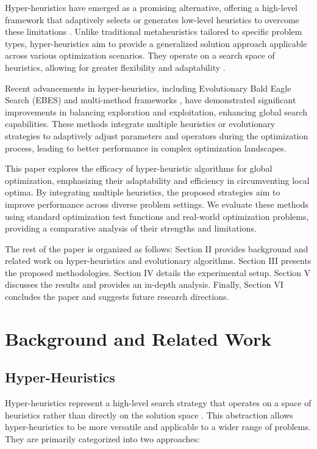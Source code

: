 \documentclass[conference]
{IEEEtran}
\begin{document}
Hyper-heuristics have emerged as a promising alternative, offering a high-level framework that adaptively selects or generates low-level heuristics to overcome these limitations \cite{burke2013hyper}. Unlike traditional metaheuristics tailored to specific problem types, hyper-heuristics aim to provide a generalized solution approach applicable across various optimization scenarios. They operate on a search space of heuristics, allowing for greater flexibility and adaptability \cite{chakhlevitch2008hyper}.

Recent advancements in hyper-heuristics, including Evolutionary Bald Eagle Search (EBES) and multi-method frameworks \cite{grobler2010alternative}, have demonstrated significant improvements in balancing exploration and exploitation, enhancing global search capabilities. These methods integrate multiple heuristics or evolutionary strategies to adaptively adjust parameters and operators during the optimization process, leading to better performance in complex optimization landscapes.

This paper explores the efficacy of hyper-heuristic algorithms for global optimization, emphasizing their adaptability and efficiency in circumventing local optima. By integrating multiple heuristics, the proposed strategies aim to improve performance across diverse problem settings. We evaluate these methods using standard optimization test functions and real-world optimization problems, providing a comparative analysis of their strengths and limitations.

The rest of the paper is organized as follows: Section II provides background and related work on hyper-heuristics and evolutionary algorithms. Section III presents the proposed methodologies. Section IV details the experimental setup. Section V discusses the results and provides an in-depth analysis. Finally, Section VI concludes the paper and suggests future research directions.

\section{Background and Related Work}

\subsection{Hyper-Heuristics}

Hyper-heuristics represent a high-level search strategy that operates on a space of heuristics rather than directly on the solution space \cite{burke2013hyper}. This abstraction allows hyper-heuristics to be more versatile and applicable to a wider range of problems. They are primarily categorized into two approaches:
\end{document}
